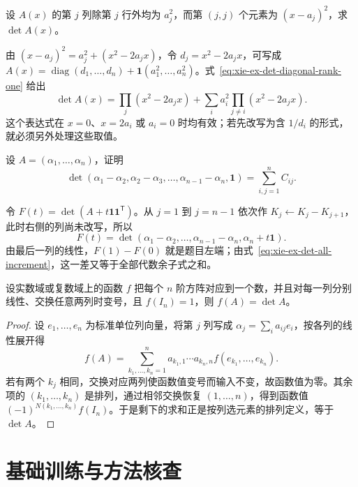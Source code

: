 \begin{example}
\label{ex:xie-ex-det-squared-diagonal}
设 $A(x)$ 的第 $j$ 列除第 $j$ 行外均为 $a_j^2$，而第 $(j,j)$ 个元素为 $(x-a_j)^2$，求 $\det A(x)$。
\end{example}

\begin{solve}
由 $(x-a_j)^2=a_j^2+(x^2-2a_jx)$，令 $d_j=x^2-2a_jx$，可写成 $A(x)=\operatorname{diag}(d_1,\ldots,d_n)+\mathbf1(a_1^2,\ldots,a_n^2)$。式~\eqref{eq:xie-ex-det-diagonal-rank-one} 给出
\[
\det A(x)=\prod_j(x^2-2a_jx)
+\sum_i a_i^2\prod_{j\ne i}(x^2-2a_jx).
\]
这个表达式在 $x=0$、$x=2a_i$ 或 $a_i=0$ 时均有效；若先改写为含 $1/d_i$ 的形式，就必须另外处理这些取值。
\end{solve}

\begin{example}
\label{ex:xie-ex-det-cofactor-sum}
设 $A=(\alpha_1,\ldots,\alpha_n)$，证明
\[
\det(\alpha_1-\alpha_2,\alpha_2-\alpha_3,\ldots,
\alpha_{n-1}-\alpha_n,\mathbf1)=\sum_{i,j=1}^{n}C_{ij}.
\]
\end{example}

\begin{solve}
令 $F(t)=\det(A+t\mathbf1\mathbf1^{\mathsf T})$。从 $j=1$ 到 $j=n-1$ 依次作 $K_j\leftarrow K_j-K_{j+1}$，此时右侧的列尚未改写，所以
\[
F(t)=\det(\alpha_1-\alpha_2,\ldots,\alpha_{n-1}-\alpha_n,
\alpha_n+t\mathbf1).
\]
由最后一列的线性，$F(1)-F(0)$ 就是题目左端；由式~\eqref{eq:xie-ex-det-all-increment}，这一差又等于全部代数余子式之和。
\end{solve}

\begin{theorem}[行列式的刻画]
\label{thm:xie-ex-det-characterization}
设实数域或复数域上的函数 $f$ 把每个 $n$ 阶方阵对应到一个数，并且对每一列分别线性、交换任意两列时变号，且 $f(I_n)=1$，则 $f(A)=\det A$。
\end{theorem}

\begin{proof}
设 $e_1,\ldots,e_n$ 为标准单位列向量，将第 $j$ 列写成 $\alpha_j=\sum_i a_{ij}e_i$，按各列的线性展开得
\[
f(A)=\sum_{k_1,\ldots,k_n=1}^{n}
a_{k_1,1}\cdots a_{k_n,n}f(e_{k_1},\ldots,e_{k_n}).
\]
若有两个 $k_j$ 相同，交换对应两列使函数值变号而输入不变，故函数值为零。其余项的 $(k_1,\ldots,k_n)$ 是排列，通过相邻交换恢复 $(1,\ldots,n)$，得到函数值 $(-1)^{N(k_1,\ldots,k_n)}f(I_n)$。于是剩下的求和正是按列选元素的排列定义，等于 $\det A$。
\end{proof}

\section{基础训练与方法核查}
\label{sec:xie-ex-det-exercises}

